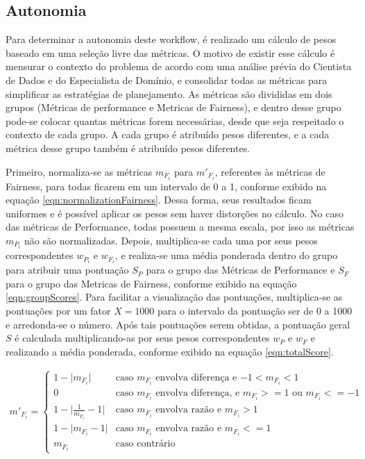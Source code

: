 \documentclass{article}
\begin{document}
\subsection{Autonomia}

Para determinar a autonomia deste workflow, é realizado um cálculo de pesos baseado em uma seleção livre das métricas. O motivo de existir esse cálculo é mensurar o contexto do problema de acordo com uma análise prévia do Cientista de Dados e do Especialista de Domínio, e consolidar todas as métricas para simplificar as estratégias de planejamento. As métricas são divididas em dois grupos (Métricas de performance e Metricas de Fairness), e dentro desse grupo pode-se colocar quantas métricas forem necessárias, desde que seja respeitado o contexto de cada grupo. A cada grupo é atribuído pesos diferentes, e a cada métrica desse grupo também é atribuído pesos diferentes.

Primeiro, normaliza-se as métricas $m_{F_i}$ para $m'_{F_i}$, referentes às métricas de Fairness, para todas ficarem em um intervalo de 0 a 1, conforme exibido na equação \ref{eqn:normalizationFairness}. Dessa forma, seus resultados ficam uniformes e é possível aplicar os pesos sem haver distorções no cálculo. No caso das métricas de Performance, todas possuem a mesma escala, por isso as métricas $m_{P_i}$ não são normalizadas. Depois, multiplica-se cada uma por seus pesos correspondentes $w_{P_i}$ e $w_{F_i}$, e realiza-se uma média ponderada dentro do grupo para atribuir uma pontuação $S_P$ para o grupo das Métricas de Performance e $S_F$ para o grupo das Metricas de Fairness, conforme exibido na equação \ref{eqn:groupScores}. Para facilitar a visualização das pontuações, multiplica-se as pontuações por um fator $X = 1000$ para o intervalo da pontuação ser de 0 a 1000 e arredonda-se o número. Após tais pontuações serem obtidas, a pontuação geral $S$ é calculada multiplicando-as por seus pesos correspondentes $w_P$ e $w_F$ e realizando a média ponderada, conforme exibido na equação \ref{eqn:totalScore}.

\begin{equation}
\label{eqn:normalizationFairness}
	\begin{aligned}
	m'_{F_i} = 
	\begin{cases}
	1-\lvert m_{F_i} \rvert & \text{caso $m_{F_i}$ envolva diferen\c{c}a e $-1 < m_{F_i} < 1$}\\
	0 & \text{caso $m_{F_i}$ envolva diferen\c{c}a, e $m_{F_i} >= 1$ ou $m_{F_i} <= -1$}\\
	1-\lvert \frac{1}{m_{F_i}}-1 \lvert & \text{caso $m_{F_i}$ envolva razão e $m_{F_i} > 1$}\\
	1-\lvert m_{F_i}-1 \lvert & \text{caso $m_{F_i}$ envolva razão e $m_{F_i} <= 1$}\\
	m_{F_i} & \text{caso contrário}
	\end{cases}
	\end{aligned}
\end{equation}
\end{document}

